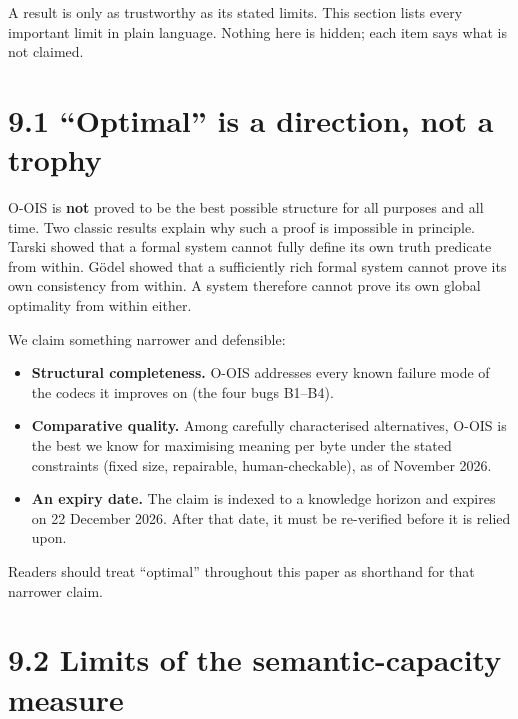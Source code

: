 \label{sec:limitations}

A result is only as trustworthy as its stated limits. This section lists every important limit in plain language. Nothing here is hidden; each item says what is not claimed.

\section*{9.1 ``Optimal'' is a direction, not a trophy}

O-OIS is \textbf{not} proved to be the best possible structure for all purposes and all time. Two classic results explain why such a proof is impossible in principle. Tarski showed that a formal system cannot fully define its own truth predicate from within. Gödel showed that a sufficiently rich formal system cannot prove its own consistency from within. A system therefore cannot prove its own global optimality from within either.

We claim something narrower and defensible:

\begin{itemize}
\item \textbf{Structural completeness.} O-OIS addresses every known failure mode of the codecs it improves on (the four bugs B1--B4).
\item \textbf{Comparative quality.} Among carefully characterised alternatives, O-OIS is the best we know for maximising meaning per byte under the stated constraints (fixed size, repairable, human-checkable), as of November 2026.
\item \textbf{An expiry date.} The claim is indexed to a knowledge horizon and expires on 22 December 2026. After that date, it must be re-verified before it is relied upon.
\end{itemize}

Readers should treat ``optimal'' throughout this paper as shorthand for that narrower claim.

\section*{9.2 Limits of the semantic-capacity measure}

